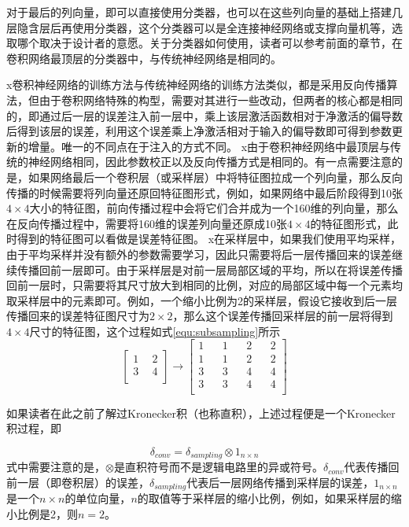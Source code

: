 对于最后的列向量，即可以直接使用分类器，也可以在这些列向量的基础上搭建几层隐含层后再使用分类器，这个分类器可以是全连接神经网络或支撑向量机等，选取哪个取决于设计者的意愿。关于分类器如何使用，读者可以参考前面的章节，在卷积网络最顶层的分类器中，与传统神经网络是相同的。

x卷积神经网络的训练方法与传统神经网络的训练方法类似，都是采用反向传播算法，但由于卷积网络特殊的构型，需要对其进行一些改动，但两者的核心都是相同的，即通过后一层的误差注入前一层中，乘上该层激活函数相对于净激活的偏导数后得到该层的误差，利用这个误差乘上净激活相对于输入的偏导数即可得到参数更新的增量。唯一的不同点在于注入的方式不同。
x由于卷积神经网络中最顶层与传统的神经网络相同，因此参数校正以及反向传播方式是相同的。有一点需要注意的是，如果网络最后一个卷积层（或采样层）中将特征图拉成一个列向量，那么反向传播的时候需要将列向量还原回特征图形式，例如，如果网络中最后阶段得到10张$4\times 4$大小的特征图，前向传播过程中会将它们合并成为一个160维的列向量，那么在反向传播过程中，需要将160维的误差列向量还原成10张$4\times 4$的特征图形式，此时得到的特征图可以看做是误差特征图。
x在采样层中，如果我们使用平均采样，由于平均采样并没有额外的参数需要学习，因此只需要将后一层传播回来的误差继续传播回前一层即可。由于采样层是对前一层局部区域的平均，所以在将误差传播回前一层时，只需要将其尺寸放大到相同的比例，对应的局部区域中每一个元素均取采样层中的元素即可。例如，一个缩小比例为2的采样层，假设它接收到后一层传播回来的误差特征图尺寸为$2\times 2$，那么这个误差传播回采样层的前一层将得到$4\times 4$尺寸的特征图，这个过程如式\eqref{equ:subsampling}所示
\begin{equation}
\left[
\begin{array}{cc}
1&~~2\\
3&~~4\\
\end{array}
\right]\rightarrow 
\left[
\begin{array}{cccc}
1 &~~~~1 &~~~~2& ~~~~2\\
1 &~~~~1 &~~~~2& ~~~~2\\
3 &~~~~3 &~~~~4 &~~~~4\\
3 &~~~~3 &~~~~4 &~~~~4\\
\end{array}
\right] \label{equ:subsampling}
\end{equation}

如果读者在此之前了解过Kronecker积（也称直积），上述过程便是一个Kronecker积过程，即

\begin{equation}
\delta_{conv} = \delta_{sampling} \otimes 1_{n \times n}
\end{equation}
式中需要注意的是，$\otimes$是直积符号而不是逻辑电路里的异或符号。$\delta_{conv}$代表传播回前一层（即卷积层）的误差，$\delta_{sampling} $代表后一层网络传播到采样层的误差，$1_{n \times n}$是一个$n \times n$的单位向量，$n$的取值等于采样层的缩小比例，例如，如果采样层的缩小比例是2，则$n=2$。

